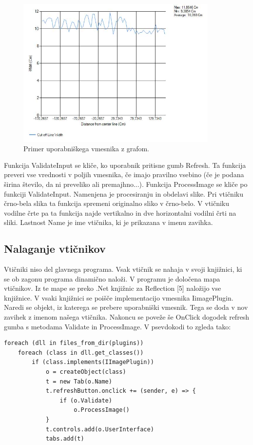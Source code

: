 \documentclass[oneside, a4paper, 12pt]{book}
\begin{document}
\begin{figure}
\begin{center}
\includegraphics[width=10cm]{slike/vmesnik-samo-graf.jpg}
\end{center}
\caption{Primer uporabniškega vmesnika z grafom.}
\label{pic:vmesnik3}
\end{figure}

Funkcija ValidateInput se kliče, ko uporabnik pritisne gumb Refresh. Ta funkcija preveri vse vrednosti v poljih vmesnika, če imajo pravilno vsebino (če je podana širina število, da ni preveliko ali premajhno...). Funkcija ProcessImage se kliče po funkciji ValidateInput. Namenjena je procesiranju in obdelavi slike. Pri vtičniku črno-bela slika ta funkcija spremeni originalno sliko v črno-belo. V vtičniku vodilne črte pa ta funkcija najde vertikalno in dve horizontalni vodilni črti na sliki. Lastnost Name je ime vtičnika, ki je prikazana v imenu zavihka.

\subsection{Nalaganje vtičnikov}
Vtičniki niso del glavnega programa. Vsak vtičnik se nahaja v svoji knjižnici, ki se ob zagonu programa dinamično naloži. V programu je določena mapa vtičnikov. Iz te mape se preko .Net knjižnic za Reflection [5] naložijo vse knjižnice. V vsaki knjižnici se poišče implementacijo vmesnika IimagePlugin. Naredi se objekt, iz katerega se prebere uporabniški vmesnik. Tega se doda v nov zavihek z imenom našega vtičnika. Nakoncu se poveže še OnClick dogodek refresh gumba s metodama Validate in ProcessImage. V psevdokodi to zgleda tako:
\begin{verbatim}
foreach (dll in files_from_dir(plugins))
    foreach (class in dll.get_classes())
        if (class.implements(IImagePlugin))
            o = createObject(class)
            t = new Tab(o.Name)
            t.refreshButton.onclick += (sender, e) => {
                if (o.Validate)
                    o.ProcessImage()
            }
            t.controls.add(o.UserInterface)
            tabs.add(t)
\end{verbatim}
\end{document}
